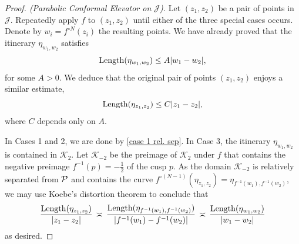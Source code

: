 \begin{proof}[Proof. (Parabolic Conformal Elevator on $\mathcal J$)] \label{parabolic-elevator}
Let  $(z_1,z_2)$ be a pair of points in $\mathcal J$. Repeatedly apply $f$ to $(z_1, z_2)$ until either of the three special cases occurs. Denote by $w_i=f^{\circ N}(z_i)$ the resulting points. We have already proved that the itinerary $\eta_{w_1,w_2}$ satisfies
\begin{equation*}
	\operatorname{Length}(\eta_{w_1,w_2}) \leq A |w_1-w_2|,
\end{equation*}
for some $A>0$. We deduce that the original pair of points $(z_1,z_2)$ enjoys a similar estimate,
\begin{equation*}
	\operatorname{Length}(\eta_{z_1,z_2}) \leq C |z_1-z_2|,
\end{equation*}
where $C$ depends only on $A$.

In Cases 1 and 2, we are done by \cref{case 1 rel. sep}. In Case 3, 
the itinerary $\eta_{w_1,w_2}$ is contained in $\mathcal K_2$. Let $\mathcal K_{-2}$ be the preimage of $\mathcal K_2$ under $f$ that contains the negative preimage $f^{-1}(p)=-\tfrac 12$ of the cusp $p$. 
As the domain $\mathcal K_{-2}$ is relatively separated from $\operatorname{\mathcal P}$ and contains the curve 
$f^{\circ (N-1)}(\eta_{z_1,z_2}) = \eta_{f^{-1}(w_1),f^{-1}(w_2)}$,
we may use Koebe's distortion theorem to conclude that
\begin{equation}
	\frac{\operatorname{Length}(\eta_{z_1,z_2})}{|z_1-z_2|} \, \asymp \,
		\frac{\operatorname{Length}(\eta_{f^{-1}(w_1),f^{-1}(w_2)})}{|f^{-1}(w_1)-f^{-1}(w_2)|} \, \asymp \,
		\frac{\operatorname{Length}(\eta_{w_1,w_2})}{|w_1-w_2|}
\end{equation}
as desired.
\end{proof}



\printnomenclature

